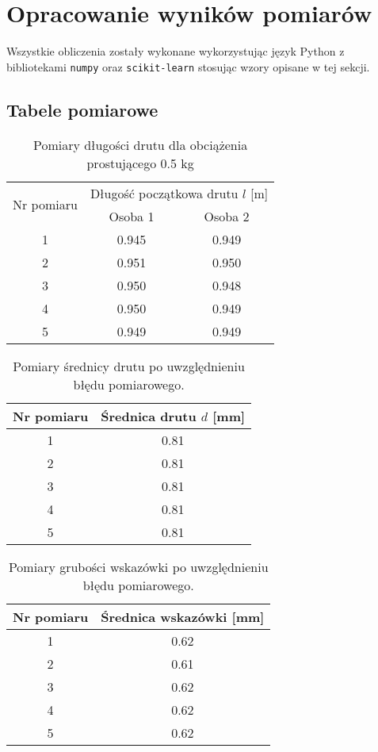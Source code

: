 \documentclass[a4paper,12pt]{article}
\begin{document}
\label{sec:opracowanie_wynikow}
\section{Opracowanie wyników pomiarów}

Wszystkie obliczenia zostały wykonane wykorzystując język Python z bibliotekami \texttt{numpy} oraz \texttt{scikit-learn} stosując wzory opisane w tej sekcji.
\subsection{Tabele pomiarowe}

\begin{table}[H]
    \centering
    \begin{tabular}{|c|c|c|}
        \hline
        \multirow{2}{*}{Nr pomiaru} & \multicolumn{2}{c|}{Długość początkowa drutu $l$ [m]} \\
        \cline{2-3}
        & Osoba 1 & Osoba 2 \\
        \hline
        1  & 0.945 & 0.949 \\ \hline
        2  & 0.951 & 0.950 \\ \hline
        3  & 0.950 & 0.948 \\ \hline
        4  & 0.950 & 0.949 \\ \hline
        5  & 0.949 & 0.949 \\ \hline
    \end{tabular}
    \caption{Pomiary długości drutu dla obciążenia prostującego 0.5 kg}
    \label{tab:wire_len}
\end{table}


\begin{table}[H]
    \centering
    \begin{tabular}{|c|c|}
        \hline
        Nr pomiaru & Średnica drutu $d$ [mm] \\
        \hline
        1 & 0.81 \\ \hline
        2 & 0.81 \\ \hline
        3 & 0.81 \\ \hline
        4 & 0.81 \\ \hline
        5 & 0.81 \\ \hline
    \end{tabular}
    \caption{Pomiary średnicy drutu po uwzględnieniu błędu pomiarowego.}
    \label{tab:srednica_drutu}
\end{table}

\begin{table}[H]
    \centering
    \begin{tabular}{|c|c|}
        \hline
        Nr pomiaru & Średnica wskazówki [mm] \\
        \hline
        1 & 0.62 \\ \hline
        2 & 0.61 \\ \hline
        3 & 0.62 \\ \hline
        4 & 0.62 \\ \hline
        5 & 0.62 \\ \hline
    \end{tabular}
    \caption{Pomiary grubości wskazówki po uwzględnieniu błędu pomiarowego.}
    \label{tab:srednica_wskazowki}
\end{table}
\end{document}
